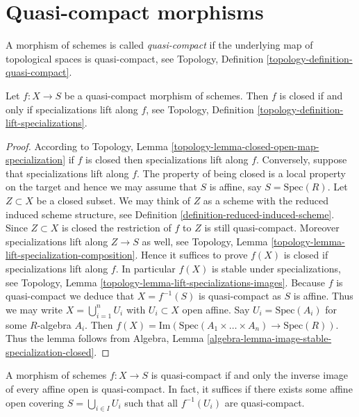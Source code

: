 \section{Quasi-compact morphisms}
\label{section-quasi-compact}

\begin{definition}
\label{definition-quasi-compact}
A morphism of schemes is called {\it quasi-compact}
if the underlying map of topological spaces is
quasi-compact, see
Topology, Definition \ref{topology-definition-quasi-compact}.
\end{definition}

\begin{lemma}
\label{lemma-quasi-compact-closed}
Let $f : X \to S$ be a quasi-compact morphism of schemes.
Then $f$ is closed if and only if specializations lift
along $f$, see
Topology, Definition \ref{topology-definition-lift-specializations}.
\end{lemma}

\begin{proof}
According to
Topology, Lemma \ref{topology-lemma-closed-open-map-specialization}
if $f$ is closed then specializations lift along $f$.
Conversely, suppose that specializations lift along $f$.
The property of being closed is a local property on the target
and hence we may assume that $S$ is affine, say $S = \text{Spec}(R)$.
Let $Z \subset X$ be a closed subset. We may think of $Z$
as a scheme with the reduced induced scheme structure, see
Definition \ref{definition-reduced-induced-scheme}.
Since $Z \subset X$ is closed the restriction
of $f$ to $Z$ is still quasi-compact. Moreover specializations lift
along $Z \to S$ as well,
see Topology, Lemma \ref{topology-lemma-lift-specialization-composition}.
Hence it suffices to prove $f(X)$ is closed if specializations lift along $f$.
In particular $f(X)$ is stable under specializations, see
Topology, Lemma \ref{topology-lemma-lift-specializations-images}.
Because $f$ is quasi-compact we deduce that $X = f^{-1}(S)$ is
quasi-compact as $S$ is affine. Thus we may write
$X = \bigcup_{i = 1}^n U_i$ with $U_i \subset X$ open affine.
Say $U_i = \text{Spec}(A_i)$ for some $R$-algebra $A_i$.
Then $f(X) = \text{Im}(\text{Spec}(A_1 \times \ldots \times A_n)
\to \text{Spec}(R))$. Thus the lemma follows from
Algebra, Lemma \ref{algebra-lemma-image-stable-specialization-closed}.
\end{proof}

\begin{lemma}
\label{lemma-quasi-compact-affine}
A morphism of schemes $f : X \to S$ is quasi-compact if and
only the inverse image of every affine open is quasi-compact.
In fact, it suffices if there exists some affine open covering
$S = \bigcup_{i \in I} U_i$ such that all $f^{-1}(U_i)$ are quasi-compact.
\end{lemma}

